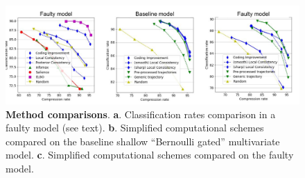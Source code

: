 \documentclass[12pt,twoside,openright]{article}
\begin{document}
\begin{figure}
	\centerline{
		\includegraphics[width = \linewidth]{img/NIPS-faulty.pdf} 
	}
	\vspace{-.2cm}
	\caption{\textbf{Method comparisons}. \textbf{a}. Classification rates comparison in a faulty model (see text). \textbf{b}. Simplified computational schemes compared on the baseline shallow ``Bernoulli gated'' multivariate model. \textbf{c}. Simplified computational schemes compared on the faulty model.}\label{fig:failed}
\end{figure}
\end{document}
